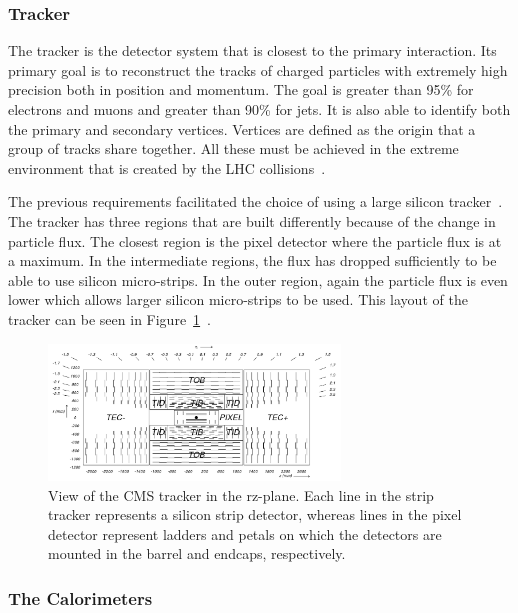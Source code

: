 \subsubsection{Tracker}
The tracker is the detector system that is closest to the primary interaction.  Its primary goal is to reconstruct the tracks of charged particles with extremely high precision both in position and momentum. The goal is greater than 95\% for electrons and muons and greater than 90\% for jets. It is also able to identify both the primary and secondary vertices.  Vertices are defined as the origin that a group of tracks share together. All these must be achieved in the extreme environment that is created by the LHC collisions~\cite{cms_trakcer_project}.

The previous requirements facilitated the choice of using a large silicon tracker~\cite{cms_trakcer_project}.  The tracker has three regions that are built differently because of the change in particle flux.  The closest region is the pixel detector where the particle flux is at a maximum.
In the intermediate regions, the flux has dropped sufficiently to be able to use silicon micro-strips.  In the outer region, again the particle flux is even lower which allows larger silicon micro-strips to be used.  This layout of the tracker can be seen in Figure~\ref{fig:CMS_tacker}~\cite{2010JInst...5.6007S}.

\begin{figure}[htb]
\centering
\includegraphics[width=0.69\textwidth]{Experiment/fig_cmstracker.png}
\caption{View of the CMS tracker in the rz-plane. Each line in the strip tracker represents a silicon strip detector, whereas lines in the pixel detector represent ladders and petals on which the detectors are mounted in the barrel and endcaps, respectively.~\cite{2010JInst...5.6007S}}
\label{fig:CMS_tacker}
\end{figure}

\subsubsection{The Calorimeters}

